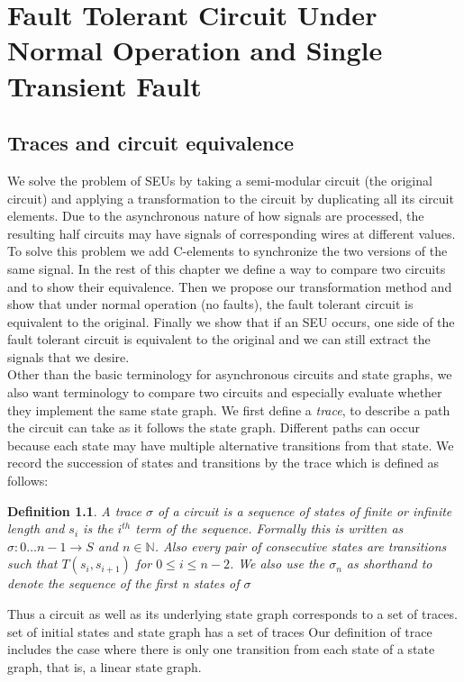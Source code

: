 \documentclass[12pt]{report}
\newtheorem*{definition}{Definition}
\begin{document}
\chapter{Fault Tolerant Circuit Under Normal Operation and Single Transient Fault}
\section{Traces and circuit equivalence}
We solve the problem of SEUs by taking a semi-modular circuit (the original circuit) and applying a transformation to the circuit by duplicating all its circuit elements.  Due to the asynchronous nature of how signals are processed, the resulting half circuits may have signals of corresponding wires at different values.  To solve this problem we add C-elements to synchronize the two versions of the same signal.  In the rest of this chapter we define a way to compare two circuits and to show their equivalence.  Then we propose our transformation method and show that under normal operation (no faults), the fault tolerant circuit is equivalent to the original.  Finally we show that if an SEU occurs, one side of the fault tolerant circuit is equivalent to the original and we can still extract the signals that we desire.\\

Other than the basic terminology for asynchronous circuits and state graphs, we also want terminology to compare two circuits and especially evaluate whether they implement the same state graph.  
We first define a {\em trace}, to describe a path the circuit can take as it follows the state graph.  Different paths can occur because each state may have multiple alternative transitions from that state.  We record the succession of states and transitions by the trace which is defined as follows:
\begin{definition}A {\em trace} $\sigma$ of a circuit is a sequence of states of finite or infinite length and $s_i$ is the $i^{th}$ term of the sequence.  Formally this is written as $\sigma: 0\ldots n-1 \to S$ and $n \in \mathbb{N}$.
 Also every pair of consecutive states are transitions such that $T(s_i,s_{i+1})$ for $ 0\leq i\leq n-2$.  We also use the $\sigma_n$ as shorthand to denote the sequence of the first n states of $\sigma$\end{definition} 
Thus a circuit as well as its underlying state graph corresponds to a set of traces.  
set of initial states
and state graph has a set of traces
Our definition of trace includes the case where there is only one transition from each state of a state graph, that is, a linear state graph.  \\
\end{document}
